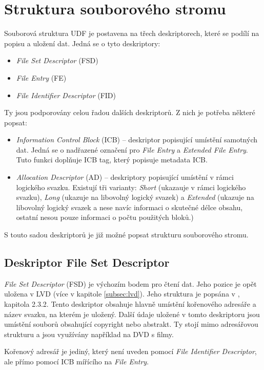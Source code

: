 \section{Struktura souborového stromu}
\label{sec:file-structure}
Souborová struktura UDF je postavena na třech deskriptorech, které se podílí na popisu a uložení dat. Jedná se o tyto deskriptory:
\begin{itemize}
    \item \textit{File Set Descriptor} (FSD)
    \item \textit{File Entry} (FE)
    \item \textit{File Identifier Descriptor} (FID)
\end{itemize}
Ty jsou podporovány celou řadou dalších deskriptorů. Z nich je potřeba některé popsat:
\begin{itemize}
    \item \textit{Information Control Block} (ICB) -- deskriptor popisující umístění samotných dat. Jedná se o nadřazené označení pro \textit{File Entry} a \textit{Extended File Entry}. Tuto funkci doplňuje ICB tag, který popisuje metadata ICB.
    \item \textit{Allocation Descriptor} (AD) -- deskriptory popisující umístění v rámci logického svazku. Existují tři varianty: \textit{Short} (ukazauje v rámci logického svazku), \textit{Long} (ukazuje na libovolný logický svazek) a \textit{Extended} (ukazuje na libovolný logický svazek a nese navíc informaci o skutečné délce obsahu, ostatní nesou pouze informaci o počtu použitých bloků.)
\end{itemize}
S touto sadou deskriptorů je již možné popsat strukturu souborového stromu.

\subsection{Deskriptor File Set Descriptor}
\label{subsec:fsd}
\textit{File Set Descriptor} (FSD) je výchozím bodem pro čtení dat. Jeho pozice je opět uložena v LVD (více v kapitole \ref{subsec:lvd}). Jeho struktura je popsána v \cite{osta-udf-0201}, kapitola 2.3.2. Tento deskriptor obsahuje hlavně umístění kořenového adresáře a název svazku, na kterém je uložený. Další údaje uložené v tomto deskriptoru jsou umístění souborů obsahující copyright nebo abstrakt. Ty stojí mimo adresářovou strukturu a jsou využívány například na DVD s filmy.

Kořenový adresář je jediný, který není uveden pomocí \textit{File Identifier Descriptor}, ale přímo pomocí ICB mířícího na \textit{File Entry}. 

